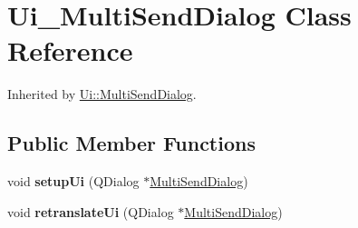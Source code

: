 \hypertarget{class_ui___multi_send_dialog}{}\section{Ui\+\_\+\+Multi\+Send\+Dialog Class Reference}
\label{class_ui___multi_send_dialog}


Inherited by \mbox{\hyperlink{class_ui_1_1_multi_send_dialog}{Ui\+::\+Multi\+Send\+Dialog}}.

\subsection*{Public Member Functions}
\begin{DoxyCompactItemize}
\item 
\mbox{\label{class_ui___multi_send_dialog_adf625958a4a721c7331afe8fa25c13e2}} 
void {\bfseries setup\+Ui} (Q\+Dialog $\ast$\mbox{\hyperlink{class_multi_send_dialog}{Multi\+Send\+Dialog}})
\item 
\mbox{\label{class_ui___multi_send_dialog_ae3f0e3214b2050306dee70cc08a694ce}} 
void {\bfseries retranslate\+Ui} (Q\+Dialog $\ast$\mbox{\hyperlink{class_multi_send_dialog}{Multi\+Send\+Dialog}})
\end{DoxyCompactItemize}
